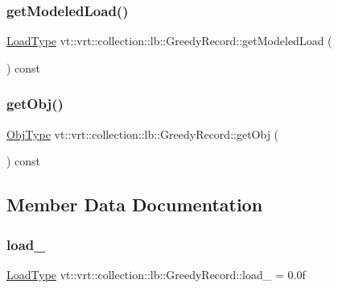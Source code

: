 \subsubsection{\texorpdfstring{get\+Modeled\+Load()}{getModeledLoad()}}
{\footnotesize\ttfamily \hyperlink{structvt_1_1vrt_1_1collection_1_1lb_1_1_greedy_record_a3ac0f749c48eb624837eda5bca988845}{Load\+Type} vt\+::vrt\+::collection\+::lb\+::\+Greedy\+Record\+::get\+Modeled\+Load (\begin{DoxyParamCaption}{ }\end{DoxyParamCaption}) const\hspace{0.3cm}{\ttfamily [inline]}}

\mbox{\label{structvt_1_1vrt_1_1collection_1_1lb_1_1_greedy_record_a5f7a3e144c43f74c587ff054af1e267f}} 
\subsubsection{\texorpdfstring{get\+Obj()}{getObj()}}
{\footnotesize\ttfamily \hyperlink{structvt_1_1vrt_1_1collection_1_1lb_1_1_greedy_record_a6b0754b2434fca9e865fa8422e3d709e}{Obj\+Type} vt\+::vrt\+::collection\+::lb\+::\+Greedy\+Record\+::get\+Obj (\begin{DoxyParamCaption}{ }\end{DoxyParamCaption}) const\hspace{0.3cm}{\ttfamily [inline]}}



\subsection{Member Data Documentation}
\mbox{\label{structvt_1_1vrt_1_1collection_1_1lb_1_1_greedy_record_a77a97b5c704fc0e2e9b0c14125051d74}} 
\subsubsection{\texorpdfstring{load\+\_\+}{load\_}}
{\footnotesize\ttfamily \hyperlink{structvt_1_1vrt_1_1collection_1_1lb_1_1_greedy_record_a3ac0f749c48eb624837eda5bca988845}{Load\+Type} vt\+::vrt\+::collection\+::lb\+::\+Greedy\+Record\+::load\+\_\+ = 0.\+0f\hspace{0.3cm}{\ttfamily [private]}}

